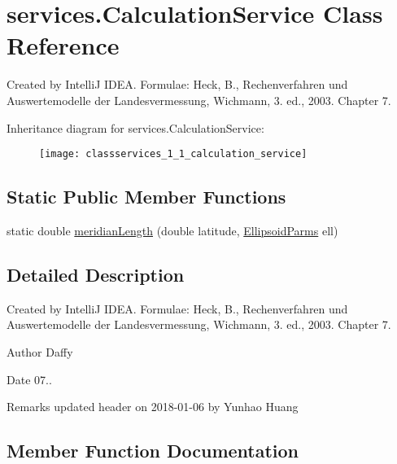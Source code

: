 \hypertarget{classservices_1_1_calculation_service}{}\section{services.\+Calculation\+Service Class Reference}
\label{classservices_1_1_calculation_service}


Created by IntelliJ I\+D\+EA. Formulae\+: Heck, B., Rechenverfahren und Auswertemodelle der Landesvermessung, Wichmann, 3. ed., 2003. Chapter 7.  


Inheritance diagram for services.\+Calculation\+Service\+:\begin{figure}[H]
\begin{center}
\leavevmode
\texttt{[image: classservices\_1\_1\_calculation\_service]}
\end{center}
\end{figure}
\subsection*{Static Public Member Functions}
\begin{DoxyCompactItemize}
\item 
static double \hyperlink{classservices_1_1_calculation_service_ad962ab1598cae8399ea253d525ed7349}{meridian\+Length} (double latitude, \hyperlink{classparams_1_1_ellipsoid_parms}{Ellipsoid\+Parms} ell)
\end{DoxyCompactItemize}


\subsection{Detailed Description}
Created by IntelliJ I\+D\+EA. Formulae\+: Heck, B., Rechenverfahren und Auswertemodelle der Landesvermessung, Wichmann, 3. ed., 2003. Chapter 7. 

\begin{DoxyAuthor}{Author}
Daffy 
\end{DoxyAuthor}
\begin{DoxyDate}{Date}
07.. 
\end{DoxyDate}
\begin{DoxyRemark}{Remarks}
updated header on 2018-\/01-\/06 by Yunhao Huang 
\end{DoxyRemark}


\subsection{Member Function Documentation}
\mbox{\label{classservices_1_1_calculation_service_ad962ab1598cae8399ea253d525ed7349}} 

